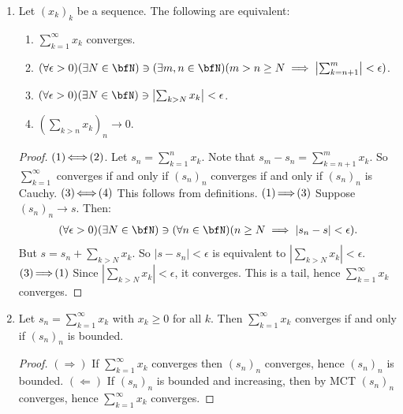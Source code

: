 \begin{enumerate}[label = (\arabic*)]
        \item Let $(x_k)_k$ be a sequence. The following are equivalent:
            \begin{enumerate}[label = (\roman*)]
                \item $\sum_{k = 1}^\infty x_k$ converges.
                \item $(\forall \epsilon > 0)(\exists N \in \bfN) \ni (\exists m,n \in \bfN)(m > n \geq N \implies \left|\sum_{k = n+1}^m\right| < \epsilon)$.
                \item $(\forall \epsilon > 0)(\exists N \in \bfN) \ni \left|\sum_{k > N}x_k\right| < \epsilon$.
                \item $\left(\sum_{k > n} x_k\right)_n \rightarrow 0$.
            \end{enumerate}
            {\color{red} \begin{proof}
                $(1)\hspace{-4pt}\iff\hspace{-4pt}(2)$. Let $s_n = \sum_{k = 1}^n x_k$. Note that $s_m - s_n = \sum_{k = n+1}^m x_k$. So $\sum_{k=1}^\infty$ converges if and only if $(s_n)_n$ converges if and only if $(s_n)_n$ is Cauchy. $(3)\hspace{-4pt}\iff\hspace{-4pt}(4)$ This follows from definitions. $(1)\hspace{-4pt}\implies\hspace{-4pt}(3)$ Suppose $(s_n)_n \rightarrow s$. Then:
                    \begin{equation*}
                    \begin{split}
                        (\forall \epsilon > 0)(\exists N \in \bfN) \ni (\forall n \in \bfN)(n \geq N \implies |s_n - s| < \epsilon).
                    \end{split}
                    \end{equation*}
                But $s = s_n + \sum_{k > N} x_k$. So $|s - s_n| < \epsilon$ is equivalent to $\left|\sum_{k > N}x_k\right| < \epsilon$. $(3)\hspace{-4pt}\implies\hspace{-4pt}(1)$ Since $\left|\sum_{k > N}x_k\right| < \epsilon$, it converges. This is a tail, hence $\sum_{k = 1}^\infty x_k$ converges.
            \end{proof}}

        \item Let $s_n = \sum_{k = 1}^\infty x_k$ with $x_k \geq 0$ for all $k$. Then $\sum_{k = 1}^\infty x_k$ converges if and only if $(s_n)_n$ is bounded.
            {\color{red} \begin{proof}
                $(\Rightarrow)$ If $\sum_{k = 1}^\infty x_k$ converges then $(s_n)_n$ converges, hence $(s_n)_n$ is bounded. $(\Leftarrow)$ If $(s_n)_n$ is bounded and increasing, then by MCT $(s_n)_n$ converges, hence $\sum_{k = 1}^\infty x_k$ converges.
            \end{proof}}


\end{enumerate}
